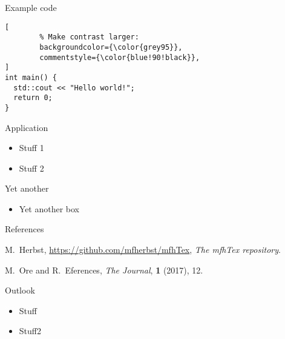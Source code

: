 \documentclass[fontscale=0.34]{MFHposter}
\begin{document}
\begin{mfhposter}
\begin{posterbox}[below=another,above=bottom]{Example code}
\begin{flushright}
\begin{minipage}{0.97\textwidth}
\begin{lstlisting}[
		% Make contrast larger:
		backgroundcolor={\color{grey95}},
		commentstyle={\color{blue!90!black}},
]
int main() {
  std::cout << "Hello world!";
  return 0;
}
\end{lstlisting}
\end{minipage}
\end{flushright}
\end{posterbox}

%
%
\begin{posterbox}[name=application,column=1,row=0]{Application}
	\vspace{5cm}
	\begin{itemize}
		\item Stuff 1
		\item Stuff 2
	\end{itemize}
	\vspace{5cm}
\end{posterbox}

\begin{posterbox}[name=yet,column=1,below=application]{Yet another}
	\vspace{2cm}
	\begin{itemize}
		\item Yet another box
	\end{itemize}
	\vspace{2cm}
\end{posterbox}

\begin{posterbox}[name=references,column=1,above=bottom]{References}
\vspace{-1.0em}
\smaller[2]

\begin{thebibliography}{2}
	M.~Herbst, \url{https://github.com/mfherbst/mfhTex}, \textit{The mfhTex repository}.

	M.~Ore and R.~Eferences, \textit{The Journal}, \textbf{1} (2017), 12.
\end{thebibliography}
\end{posterbox}

\begin{posterbox}[name=outlook,column=1,below=yet,above=references]{Outlook}
\begin{itemize}
	\compresslist
	\item Stuff
	\item Stuff2
\end{itemize}
\end{posterbox}

\end{mfhposter}
\end{document}
